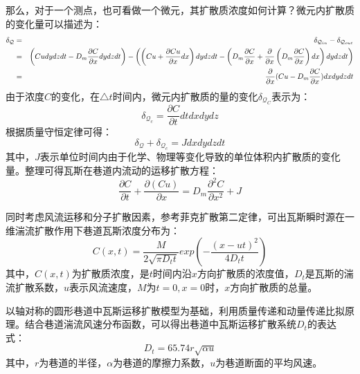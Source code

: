 那么，对于一个测点，也可看做一个微元，其扩散质浓度如何计算？微元内扩散质的变化量可以描述为：
\begin{eqnarray}
    \delta_{\mathcal{Q}} &=& \delta_{\mathcal{Q}_{in}} - \delta_{\mathcal{Q}_{out}} \notag \\
    &=& \left(Cudydzdt - D_m\dfrac{\partial C}{\partial x}dydzdt\right) - \left( \left(Cu+\dfrac{\partial Cu}{\partial x}dx\right)dydzdt-\left(D_m \dfrac{\partial C}{\partial x} + \dfrac{\partial}{\partial x}\left(D_m \dfrac{\partial C}{\partial x}\right)dx\right)dydzdt \right) \notag \\
    &=& \dfrac{\partial}{\partial x}(Cu- D_m \dfrac{\partial C}{\partial x})dxdydzdt
    \label{eq-diffuseness}
\end{eqnarray}
由于浓度$C$的变化，在$\triangle t$时间内，微元内扩散质的量的变化$\delta_{\mathcal{Q}_C}$表示为：
\begin{equation}
    \delta_{\mathcal{Q}_c} = \dfrac{\partial C}{\partial t}dtdxdydz
    \label{eq-diffusenesschange}
\end{equation}
根据质量守恒定律可得：
\begin{equation}
    \delta_{\mathcal{Q}} + \delta_{\mathcal{Q}_c} = Jdxdydzdt
    \label{eq-conservation}
\end{equation}
其中，$J$表示单位时间内由于化学、物理等变化导致的单位体积内扩散质的变化量。整理可得瓦斯在巷道内流动的运移扩散方程：
\begin{equation}
    \dfrac{\partial C}{\partial t}+\dfrac{\partial(Cu)}{\partial x} = D_m\dfrac{\partial^2C}{\partial x^2}+J
    \label{eq-gasdiffuseness}
\end{equation}


同时考虑风流运移和分子扩散因素，参考菲克扩散第二定律，可出瓦斯瞬时源在一维湍流扩散作用下巷道瓦斯浓度分布为：
\begin{equation}
    C(x,t) = \dfrac{M}{2\sqrt{\pi D_t t}}exp\left(-\dfrac{(x-ut)^2}{4D_t t}\right)
    \label{eq2.22}
\end{equation}
其中，$C(x,t)$为扩散质浓度，是$t$时间内沿$x$方向扩散质的浓度值，$D_t$是瓦斯的湍流扩散系数，$u$表示风流速度，$M$为$t=0,x=0$时，$x$方向扩散质的总量。

以轴对称的圆形巷道中瓦斯运移扩散模型为基础，利用质量传递和动量传递比拟原理。结合巷道湍流风速分布函数，可以得出巷道中瓦斯运移扩散系统$D_t$的表达式：
\begin{equation}
    D_t = 65.74r\sqrt{\alpha u}
    \label{eq-diffusenesscoefficiency}
\end{equation}
其中，$r$为巷道的半径，$\alpha$为巷道的摩擦力系数，$u$为巷道断面的平均风速。

